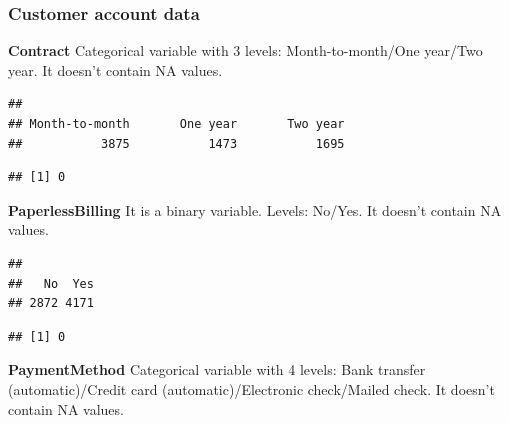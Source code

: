 \documentclass[
  twoside]{article}
\newenvironment{Shaded}{\begin{snugshade}}{\end{snugshade}}
\newcommand{\FunctionTok}[1]{\textcolor[rgb]{0.00,0.00,0.00}{#1}}
\newcommand{\NormalTok}[1]{#1}
\newcommand{\SpecialCharTok}[1]{\textcolor[rgb]{0.00,0.00,0.00}{#1}}
\begin{document}
\hypertarget{customer-account-data}{%
\subsubsection{Customer account data}\label{customer-account-data}}

\textbf{Contract} Categorical variable with 3 levels: Month-to-month/One
year/Two year. It doesn't contain NA values.

\begin{verbatim}
## 
## Month-to-month       One year       Two year 
##           3875           1473           1695
\end{verbatim}

\begin{verbatim}
## [1] 0
\end{verbatim}

\textbf{PaperlessBilling} It is a binary variable. Levels: No/Yes. It
doesn't contain NA values.

\begin{Shaded}
\end{Shaded}

\begin{verbatim}
## 
##   No  Yes 
## 2872 4171
\end{verbatim}

\begin{Shaded}
\end{Shaded}

\begin{verbatim}
## [1] 0
\end{verbatim}

\textbf{PaymentMethod} Categorical variable with 4 levels: Bank transfer
(automatic)/Credit card (automatic)/Electronic check/Mailed check. It
doesn't contain NA values.

\begin{Shaded}
\end{Shaded}
\end{document}
